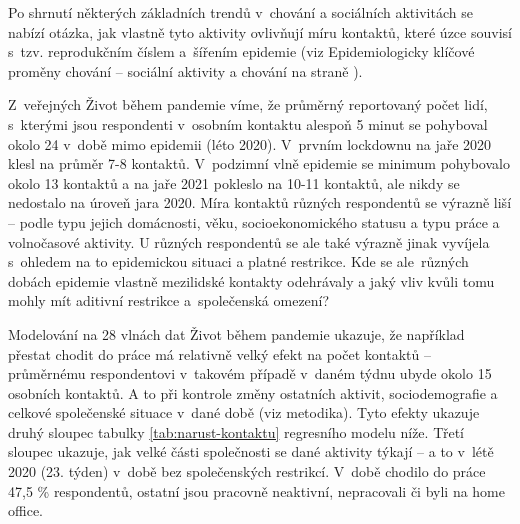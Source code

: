 Po shrnutí některých základních trendů v chování a sociálních aktivitách se nabízí otázka, jak vlastně tyto aktivity ovlivňují míru kontaktů, které úzce souvisí s tzv. reprodukčním číslem a šířením epidemie (viz Epidemiologicky klíčové proměny chování – sociální aktivity a chování na straně \pageref{Epidemi_promeny}). 

Z veřejných Život během pandemie víme, že průměrný reportovaný počet lidí, s kterými jsou respondenti v osobním kontaktu alespoň 5 minut se pohyboval okolo 24 v době mimo epidemii (léto 2020). V prvním lockdownu na jaře 2020 klesl na průměr 7-8 kontaktů. V podzimní vlně epidemie se minimum pohybovalo okolo 13 kontaktů a na jaře 2021 pokleslo na 10-11 kontaktů, ale nikdy se nedostalo na úroveň jara 2020. Míra kontaktů různých respondentů se výrazně liší – podle typu jejich domácnosti, věku, socioekonomického statusu a typu práce a volnočasové aktivity. U různých respondentů se ale také výrazně jinak vyvíjela s ohledem na to epidemickou situaci a platné restrikce. Kde se ale různých dobách epidemie vlastně mezilidské kontakty odehrávaly a jaký vliv kvůli tomu mohly mít aditivní restrikce a společenská omezení? 

Modelování na 28 vlnách dat Život během pandemie ukazuje, že například přestat chodit do práce má relativně velký efekt na počet kontaktů – průměrnému respondentovi v takovém případě v daném týdnu ubyde okolo 15 osobních kontaktů. A to při kontrole změny ostatních aktivit, sociodemografie a celkové společenské situace v dané době (viz metodika). Tyto efekty ukazuje druhý sloupec tabulky \ref{tab:narust-kontaktu} regresního modelu níže. Třetí sloupec ukazuje, jak velké části společnosti se dané aktivity týkají – a to v létě 2020 (23. týden)
v době bez společenských restrikcí. V době chodilo do práce 47,5 \% respondentů, ostatní jsou pracovně neaktivní, nepracovali či byli na home office. 


